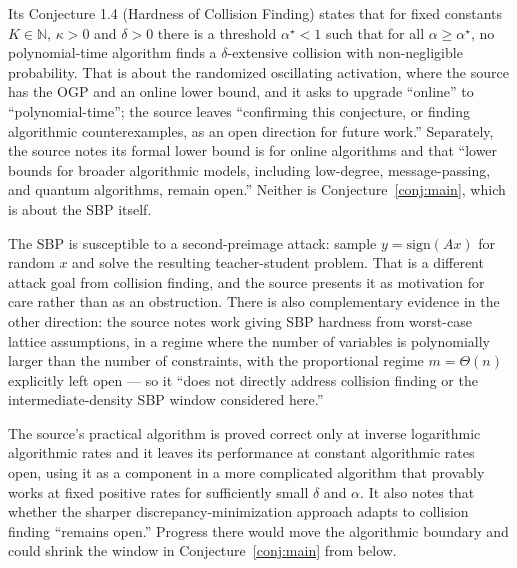 \documentclass{aicr-conjecture}
\begin{document}
\begin{remark}\label{rem:neighbours}
Its Conjecture 1.4 (Hardness of Collision Finding) states that for fixed
constants $K \in \mathbb{N}$, $\kappa > 0$ and $\delta > 0$ there is a
threshold $\alpha^{\star} < 1$ such that for all $\alpha \ge
\alpha^{\star}$, no polynomial-time algorithm finds a $\delta$-extensive
collision with non-negligible probability. That is about the randomized
oscillating activation, where the source has the OGP and an online lower
bound, and it asks to upgrade ``online'' to ``polynomial-time''; the
source leaves ``confirming this conjecture, or finding algorithmic
counterexamples, as an open direction for future work.'' Separately, the
source notes its formal lower bound is for online algorithms and that
``lower bounds for broader algorithmic models, including low-degree,
message-passing, and quantum algorithms, remain open.'' Neither is
Conjecture~\ref{conj:main}, which is about the SBP itself.
\end{remark}

\begin{remark}\label{rem:evidence}
The SBP is susceptible to a second-preimage attack: sample $y =
\mathrm{sign}(Ax)$ for random $x$ and solve the resulting teacher-student
problem. That is a different attack goal from collision finding, and the
source presents it as motivation for care rather than as an obstruction.
There is also complementary evidence in the other direction: the source
notes work giving SBP hardness from worst-case lattice assumptions, in a
regime where the number of variables is polynomially larger than the
number of constraints, with the proportional regime $m = \Theta(n)$
explicitly left open --- so it ``does not directly address collision
finding or the intermediate-density SBP window considered here.''
\end{remark}

\begin{remark}\label{rem:rates}
The source's practical algorithm is proved correct only at inverse
logarithmic algorithmic rates and it leaves its performance at constant
algorithmic rates open, using it as a component in a more complicated
algorithm that provably works at fixed positive rates for sufficiently
small $\delta$ and $\alpha$. It also notes that whether the sharper
discrepancy-minimization approach adapts to collision finding ``remains
open.'' Progress there would move the algorithmic boundary and could
shrink the window in Conjecture~\ref{conj:main} from below.
\end{remark}
\end{document}

